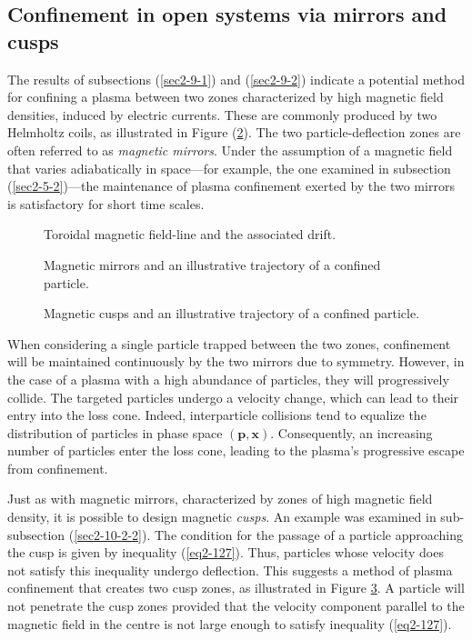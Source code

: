 \subsection{Confinement in open systems via mirrors and cusps}

The results of subsections (\ref{sec2-9-1}) and (\ref{sec2-9-2}) indicate a potential method for confining a plasma between two zones characterized by high magnetic field densities, induced by electric currents. These are commonly produced by two Helmholtz coils, as illustrated in Figure (\ref{fig-3-1}). The two particle-deflection zones are often referred to as \textit{magnetic mirrors}. Under the assumption of a magnetic field that varies adiabatically in space—for example, the one examined in subsection (\ref{sec2-5-2})—the maintenance of plasma confinement exerted by the two mirrors is satisfactory for short time scales.

\begin{figure}[H]
    \centering
    \scalebox{1.75}{}
    \caption{Toroidal magnetic field-line and the associated drift.}
    \label{fig3-4}
\end{figure}

\begin{figure}[H]
    \centering
    \scalebox{1}{}
    \caption{Magnetic mirrors and an illustrative trajectory of a confined particle.}
    \label{fig-3-1}
\end{figure}

\begin{figure}[H]
    \centering
    \scalebox{0.95}{}
    \caption{Magnetic cusps and an illustrative trajectory of a confined particle.}
    \label{fig3-2}
\end{figure}

\quad When considering a single particle trapped between the two zones, confinement will be maintained continuously by the two mirrors due to symmetry. However, in the case of a plasma with a high abundance of particles, they will progressively collide. The targeted particles undergo a velocity change, which can lead to their entry into the loss cone. Indeed, interparticle collisions tend to equalize the distribution of particles in phase space $(\mathbf{p}, \mathbf{x})$. Consequently, an increasing number of particles enter the loss cone, leading to the plasma's progressive escape from confinement.

\quad Just as with magnetic mirrors, characterized by zones of high magnetic field density, it is possible to design magnetic \textit{cusps}. An example was examined in sub-subsection (\ref{sec2-10-2-2}). The condition for the passage of a particle approaching the cusp is given by inequality (\ref{eq2-127}). Thus, particles whose velocity does not satisfy this inequality undergo deflection. This suggests a method of plasma confinement that creates two cusp zones, as illustrated in Figure \ref{fig3-2}. A particle will not penetrate the cusp zones provided that the velocity component parallel to the magnetic field in the centre is not large enough to satisfy inequality (\ref{eq2-127}).

